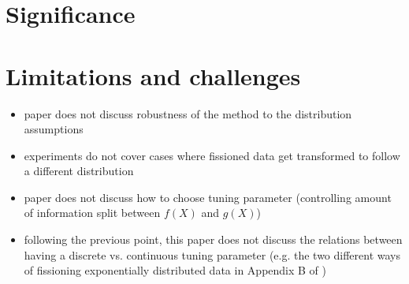 \section{Significance}

\section{Limitations and challenges}

\begin{itemize}
\item paper does not discuss robustness of the method to the distribution assumptions
\item experiments do not cover cases where fissioned data get transformed to follow a different distribution
\item paper does not discuss how to choose tuning parameter (controlling amount of information split between $f(X)$ and $g(X)$)
\item following the previous point, this paper does not discuss the relations between having a discrete vs. continuous tuning parameter (e.g. the two different ways of fissioning exponentially distributed data in Appendix B of \cite{leiner2022data})
\end{itemize}
